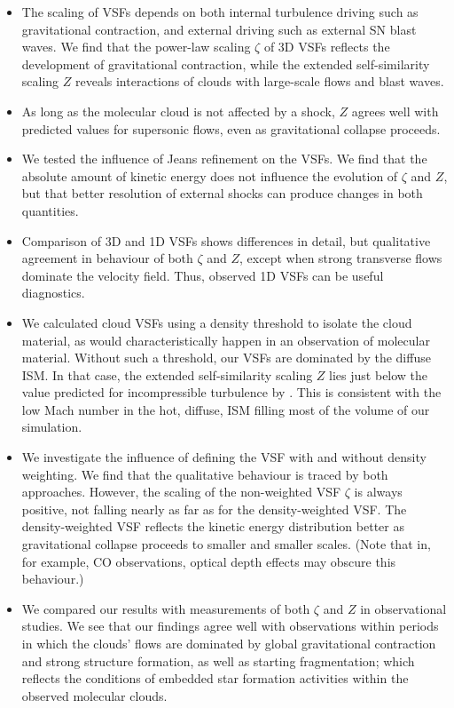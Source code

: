 \documentclass{aa}		%
\begin{document}
\begin{itemize}
\item The scaling of VSFs depends on both internal turbulence driving such as gravitational contraction, and external driving such as external SN blast waves. We find that the power-law scaling $\zeta$ of 3D VSFs reflects the development of gravitational contraction, while the extended self-similarity scaling $Z$ reveals interactions of clouds with large-scale flows and blast waves.
\item As long as the molecular cloud is not affected by a shock, $Z$ agrees well with predicted values for supersonic flows, even as gravitational collapse proceeds.
\item We tested the influence of Jeans refinement on the VSFs. We find that the absolute amount of kinetic energy does not influence the evolution of $\zeta$ and $Z$, but that better resolution of external shocks can produce changes in both quantities.
\item Comparison of 3D and 1D VSFs shows differences in detail, but qualitative agreement in behaviour of both $\zeta$ and $Z$, except when strong transverse flows dominate the velocity field. Thus, observed 1D VSFs can be useful diagnostics. 
\item We calculated cloud VSFs using a density threshold to isolate the cloud material, as would characteristically happen in an observation of molecular material. Without such a threshold, our VSFs are dominated by the diffuse ISM. In that case, the extended self-similarity scaling $Z$ lies just below the value predicted for incompressible turbulence by \citet{She1994}. This is consistent with the low Mach number in the hot, diffuse, ISM filling most of the volume of our simulation.
\item We investigate the influence of defining the VSF with and without density weighting. We find that the qualitative behaviour is traced by both approaches. However, the scaling of the non-weighted VSF $\zeta$ is always positive, not falling nearly as far as for the density-weighted VSF. The density-weighted VSF reflects the kinetic energy distribution better as gravitational collapse proceeds to smaller and smaller scales. (Note that in, for example, CO observations, optical depth effects may obscure this behaviour.) 
\item We compared our results with measurements of both $\zeta$ and $Z$ in observational studies. We see that our findings agree well with observations within periods in which the clouds' flows are dominated by global gravitational contraction and strong structure formation, as well as starting fragmentation; which reflects the conditions of embedded star formation activities within the observed molecular clouds.
\end{itemize}
\end{document}
